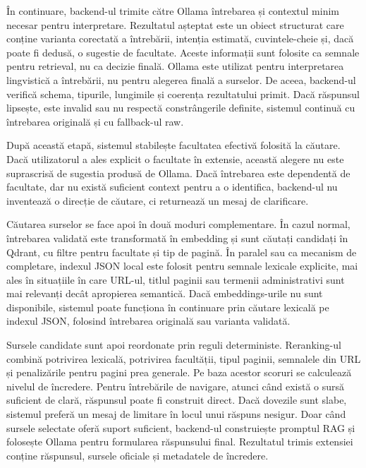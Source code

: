 \documentclass[12pt,a4paper]{report}
\theoremstyle{definition}
\theoremstyle{remark}
\begin{document}
În continuare, backend-ul trimite către Ollama întrebarea și contextul minim necesar pentru interpretare. Rezultatul așteptat este un obiect structurat care conține varianta corectată a întrebării, intenția estimată, cuvintele-cheie și, dacă poate fi dedusă, o sugestie de facultate. Aceste informații sunt folosite ca semnale pentru retrieval, nu ca decizie finală. Ollama este utilizat pentru interpretarea lingvistică a întrebării, nu pentru alegerea finală a surselor. De aceea, backend-ul verifică schema, tipurile, lungimile și coerența rezultatului primit. Dacă răspunsul lipsește, este invalid sau nu respectă constrângerile definite, sistemul continuă cu întrebarea originală și cu fallback-ul raw.

După această etapă, sistemul stabilește facultatea efectivă folosită la căutare. Dacă utilizatorul a ales explicit o facultate în extensie, această alegere nu este suprascrisă de sugestia produsă de Ollama. Dacă întrebarea este dependentă de facultate, dar nu există suficient context pentru a o identifica, backend-ul nu inventează o direcție de căutare, ci returnează un mesaj de clarificare.

Căutarea surselor se face apoi în două moduri complementare. În cazul normal, întrebarea validată este transformată în embedding și sunt căutați candidați în Qdrant, cu filtre pentru facultate și tip de pagină. În paralel sau ca mecanism de completare, indexul JSON local este folosit pentru semnale lexicale explicite, mai ales în situațiile în care URL-ul, titlul paginii sau termenii administrativi sunt mai relevanți decât apropierea semantică. Dacă embeddings-urile nu sunt disponibile, sistemul poate funcționa în continuare prin căutare lexicală pe indexul JSON, folosind întrebarea originală sau varianta validată.

Sursele candidate sunt apoi reordonate prin reguli deterministe. Reranking-ul combină potrivirea lexicală, potrivirea facultății, tipul paginii, semnalele din URL și penalizările pentru pagini prea generale. Pe baza acestor scoruri se calculează nivelul de încredere. Pentru întrebările de navigare, atunci când există o sursă suficient de clară, răspunsul poate fi construit direct. Dacă dovezile sunt slabe, sistemul preferă un mesaj de limitare în locul unui răspuns nesigur. Doar când sursele selectate oferă suport suficient, backend-ul construiește promptul RAG și folosește Ollama pentru formularea răspunsului final. Rezultatul trimis extensiei conține răspunsul, sursele oficiale și metadatele de încredere.
\end{document}
